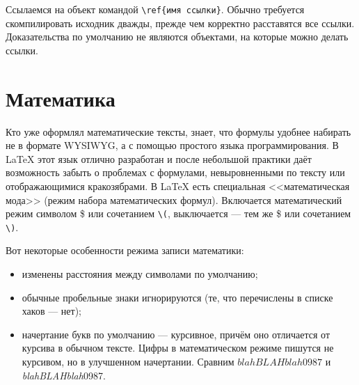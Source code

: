 \documentclass[14pt, russian]{scrartcl}
\begin{document}
Ссылаемся на объект командой \texttt{\textbackslash ref\{имя ссылки\}}. Обычно требуется скомпилировать исходник дважды, прежде чем корректно расставятся все ссылки. Доказательства по умолчанию не являются объектами, на которые можно делать ссылки.

\section{Математика}\label{Sect::mathmode}

Кто уже оформлял математические тексты, знает, что формулы удобнее набирать не в формате WYSIWYG, а с помощью простого языка программирования. В \LaTeX{} этот язык отлично разработан и после небольшой практики даёт возможность забыть о проблемах с формулами, невыровненными по тексту или отображающимися кракозябрами. В \LaTeX{} есть специальная <<математическая мода>> (режим набора математических формул). Включается математический режим символом \$ или сочетанием \texttt{\textbackslash(}, выключается --- тем же \$ или сочетанием \texttt{\textbackslash)}. 

Вот некоторые особенности режима записи математики:
\begin{itemize}
\item изменены расстояния между символами по умолчанию;
\item обычные пробельные знаки игнорируются (те, что перечислены в списке хаков --- нет);
\item начертание букв по умолчанию --- курсивное, причём оно отличается от курсива в обычном тексте. Цифры в математическом режиме пишутся не курсивом, но в улучшенном начертании. Сравним $blahBLAHblah0987$ и \textit{blahBLAHblah}0987.
\end{itemize}
\end{document}
